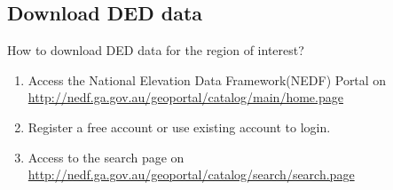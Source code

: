 \subsection{Download DED data}
How to download DED data for the region of interest?
\begin{enumerate}
\item
Access the National Elevation Data Framework(NEDF) Portal on\\
	\href{http://nedf.ga.gov.au/geoportal/catalog/main/home.page}{http://nedf.ga.gov.au/geoportal/catalog/main/home.page}

\item
Register a free account or use existing account to login.
\item
Access to the search page on \\
\href{http://nedf.ga.gov.au/geoportal/catalog/search/search.page}{http://nedf.ga.gov.au/geoportal/catalog/search/search.page}


\end{enumerate}
